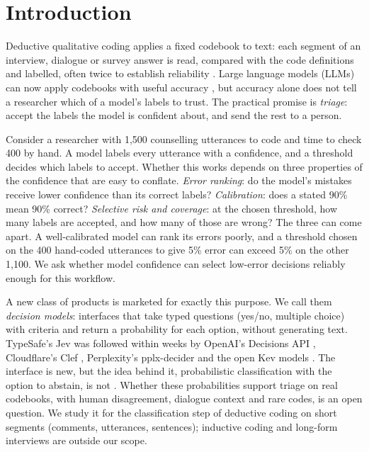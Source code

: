 \section{Introduction}
\label{sec:intro}

Deductive qualitative coding applies a fixed codebook to text: each segment of an interview, dialogue or survey answer is
read, compared with the code definitions and labelled, often twice to establish reliability \citep{krippendorff2019content}.
Large language models (LLMs) can now apply codebooks with useful accuracy
\citep{xiao2023supporting,chew2023llm,dunivin2024scalable,ziems2024can,gilardi2023chatgpt,matveyenko2025blended}, but
accuracy alone does not tell a researcher which of a model's labels to trust. The practical promise is \emph{triage}: accept
the labels the model is confident about, and send the rest to a person.

Consider a researcher with 1,500 counselling utterances to code and time to check 400 by hand. A model labels every
utterance with a confidence, and a threshold decides which labels to accept. Whether this works depends on three properties
of the confidence that are easy to conflate. \emph{Error ranking}: do the model's mistakes receive lower confidence than its
correct labels? \emph{Calibration}: does a stated 90\% mean 90\% correct? \emph{Selective risk and coverage}: at the chosen
threshold, how many labels are accepted, and how many of those are wrong? The three can come apart. A well-calibrated model
can rank its errors poorly, and a threshold chosen on the 400 hand-coded utterances to give 5\% error can exceed 5\% on the
other 1,100. We ask whether model confidence can select low-error decisions reliably enough for this workflow.

A new class of products is marketed for exactly this purpose. We call them \emph{decision models}: interfaces that take
typed questions (yes/no, multiple choice) with criteria and return a probability for each option, without generating text.
TypeSafe's Jev \citep{typesafe2026jev} was followed within weeks by OpenAI's Decisions API \citep{openai2026decisions},
Cloudflare's Clef \citep{cloudflare2026clef}, Perplexity's pplx-decider \citep{perplexity2026decider} and the open Kev
models \citep{palmer2026kev}. The interface is new, but the idea behind it, probabilistic classification with the option to
abstain, is not \citep{geifman2017selective}. Whether these probabilities support triage on real codebooks, with human
disagreement, dialogue context and rare codes, is an open question. We study it for the classification step of deductive
coding on short segments (comments, utterances, sentences); inductive coding and long-form interviews are outside our scope.

